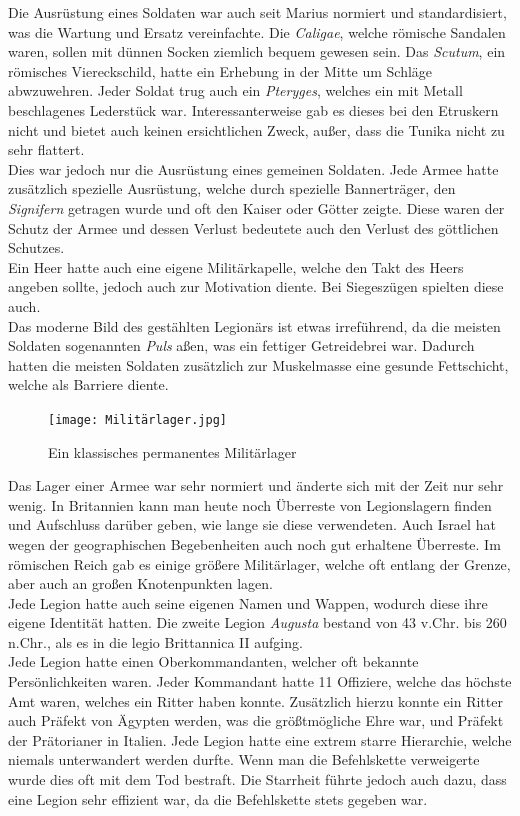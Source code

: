 \documentclass{article}
\begin{document}
	Die Ausrüstung eines Soldaten war auch seit Marius normiert und standardisiert, was die Wartung und Ersatz vereinfachte. Die \textit{Caligae}, welche römische Sandalen waren, sollen mit dünnen Socken ziemlich bequem gewesen sein. Das \textit{Scutum}, ein römisches Viereckschild, hatte ein Erhebung in der Mitte um Schläge abwzuwehren. Jeder Soldat trug auch ein \textit{Pteryges}, welches ein mit Metall beschlagenes Lederstück war. Interessanterweise gab es dieses bei den Etruskern nicht und bietet auch keinen ersichtlichen Zweck, außer, dass die Tunika nicht zu sehr flattert. \\
	Dies war jedoch nur die Ausrüstung eines gemeinen Soldaten. Jede Armee hatte zusätzlich spezielle Ausrüstung, welche durch spezielle Bannerträger, den \textit{Signifern} getragen wurde und oft den Kaiser oder Götter zeigte. Diese waren der Schutz der Armee und dessen Verlust bedeutete auch den Verlust des göttlichen Schutzes. \\
	Ein Heer hatte auch eine eigene Militärkapelle, welche den Takt des Heers angeben sollte, jedoch auch zur Motivation diente. Bei Siegeszügen spielten diese auch. \\
	Das moderne Bild des gestählten Legionärs ist etwas irreführend, da die meisten Soldaten sogenannten \textit{Puls} aßen, was ein fettiger Getreidebrei war. Dadurch hatten die meisten Soldaten zusätzlich zur Muskelmasse eine gesunde Fettschicht, welche als Barriere diente. \\
	\begin{figure}
	\texttt{[image: Militärlager.jpg]}
	\caption{Ein klassisches permanentes Militärlager}
	\end{figure}
	Das Lager einer Armee war sehr normiert und änderte sich mit der Zeit nur sehr wenig. In Britannien kann man heute noch Überreste von Legionslagern finden und Aufschluss darüber geben, wie lange sie diese verwendeten. Auch Israel hat wegen der geographischen Begebenheiten auch noch gut erhaltene Überreste. Im römischen Reich gab es einige größere Militärlager, welche oft entlang der Grenze, aber auch an großen Knotenpunkten lagen. \\
	Jede Legion hatte auch seine eigenen Namen und Wappen, wodurch diese ihre eigene Identität hatten. Die zweite Legion \textit{Augusta} bestand von 43 v.Chr. bis 260 n.Chr., als es in die legio Brittannica II aufging. \\
	Jede Legion hatte einen Oberkommandanten, welcher oft bekannte Persönlichkeiten waren. Jeder Kommandant hatte 11 Offiziere, welche das höchste Amt waren, welches ein Ritter haben konnte. Zusätzlich hierzu konnte ein Ritter auch Präfekt von Ägypten werden, was die größtmögliche Ehre war, und Präfekt der Prätorianer in Italien. Jede Legion hatte eine extrem starre Hierarchie, welche niemals unterwandert werden durfte. Wenn man die Befehlskette verweigerte wurde dies oft mit dem Tod bestraft. Die Starrheit führte jedoch auch dazu, dass eine Legion sehr effizient war, da die Befehlskette stets gegeben war. \\
\end{document}
